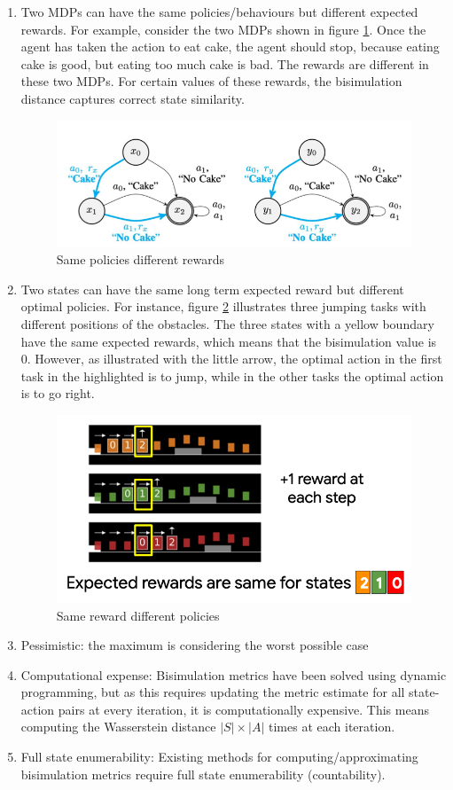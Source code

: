 \documentclass{usiinftr}
\begin{document}
\begin{enumerate}
    \item Two MDPs can have the same policies/behaviours but different expected rewards. For example, consider the two MDPs shown in figure \ref{fig:TwoMDP}. Once the agent has taken the action to eat cake, the agent should stop, because eating cake is good, but eating too much cake is bad. The rewards are different in these two MDPs. For certain values of these rewards, the bisimulation distance captures correct state similarity. \cite{slidelive}
\begin{figure}[h]
    \centering
    \includegraphics[width = 0.5\linewidth]{figures/image7.png}
    \caption{Same policies different rewards \cite{agarwal2021contrastive}}
    \label{fig:TwoMDP}
\end{figure}
    \item Two states can have the same long term expected reward but different optimal policies. For instance,  figure \ref{fig:ThreeJump} illustrates three jumping tasks with different positions of the obstacles. The three states with a yellow boundary have the same expected rewards, which means that the bisimulation value is 0. However, as illustrated with the little arrow, the optimal action in the first task in the highlighted is to jump, while in the other tasks the optimal action is to go right. 
\cite{slidelive}
\begin{figure}[h]
    \centering
    \includegraphics[width = 0.5\linewidth]{figures/image8.png}
    \caption{Same reward different policies \cite{github_contrastive_similarity}}
    \label{fig:ThreeJump}
\end{figure}
    \item Pessimistic: the maximum is considering the worst possible case
    \item Computational expense: Bisimulation metrics have been solved using dynamic programming, but as this requires updating the metric estimate for all state-action pairs at every iteration, it is computationally expensive. This means computing the Wasserstein distance $|S|\times|A|$ times at each iteration.
    \item Full state enumerability: Existing methods for computing/approximating bisimulation metrics require full state enumerability (countability).
    
\cite{castro2020scalable}
\end{enumerate}
\end{document}
